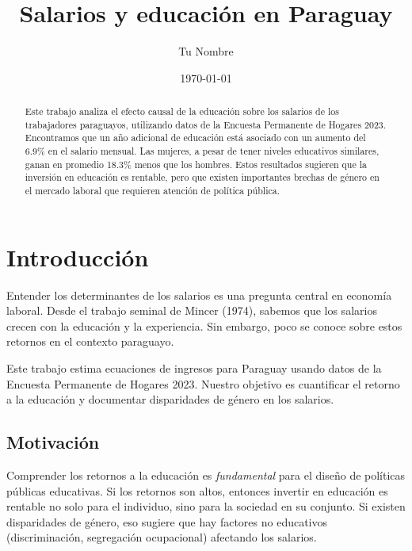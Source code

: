 \documentclass[12pt, a4paper]{article}
\title{Salarios y educación en Paraguay}
\author{Tu Nombre}
\date{\today}
\begin{document}

\maketitle
\thispagestyle{empty}

\begin{abstract}
\noindent
Este trabajo analiza el efecto causal de la educación sobre los salarios 
de los trabajadores paraguayos, utilizando datos de la Encuesta Permanente 
de Hogares 2023. Encontramos que un año adicional de educación está asociado 
con un aumento del 6.9\% en el salario mensual. Las mujeres, a pesar de tener 
niveles educativos similares, ganan en promedio 18.3\% menos que los hombres. 
Estos resultados sugieren que la inversión en educación es rentable, pero que 
existen importantes brechas de género en el mercado laboral que requieren 
atención de política pública.
\end{abstract}

\newpage
\tableofcontents
\newpage

\section{Introducción}

Entender los determinantes de los salarios es una pregunta central en economía 
laboral. Desde el trabajo seminal de Mincer (1974), sabemos que los salarios 
crecen con la educación y la experiencia. Sin embargo, poco se conoce sobre 
estos retornos en el contexto paraguayo.

Este trabajo estima ecuaciones de ingresos para Paraguay usando datos de la 
Encuesta Permanente de Hogares 2023. Nuestro objetivo es cuantificar el 
retorno a la educación y documentar disparidades de género en los salarios.

\subsection{Motivación}

Comprender los retornos a la educación es \emph{fundamental} para el diseño 
de políticas públicas educativas. Si los retornos son altos, entonces invertir 
en educación es rentable no solo para el individuo, sino para la sociedad en 
su conjunto. Si existen disparidades de género, eso sugiere que hay factores 
no educativos (discriminación, segregación ocupacional) afectando los salarios.
\end{document}
